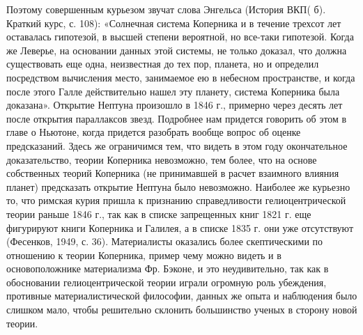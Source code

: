Поэтому совершенным курьезом звучат слова Энгельса (История ВКП( б).
Краткий курс, с. 108): «Солнечная система Коперника и в течение
трехсот лет оставалась гипотезой, в высшей степени вероятной, но
все-таки гипотезой. Когда же Леверье, на основании данных этой
системы, не только доказал, что должна существовать еще одна,
неизвестная до тех пор, планета, но и определил посредством вычисления
место, занимаемое ею в небесном пространстве, и когда после этого
Галле действительно нашел эту планету, система Коперника была
доказана». Открытие Нептуна произошло в 1846 г., примерно через десять
лет после открытия параллаксов звезд. Подробнее нам придется говорить
об этом в главе о Ньютоне, когда придется разобрать вообще вопрос об
оценке предсказаний. Здесь же ограничимся тем, что видеть в этом году
окончательное доказательство, теории Коперника невозможно, тем более,
что на основе собственных теорий Коперника (не принимавшей в расчет
взаимного влияния планет) предсказать открытие Нептуна было
невозможно. Наиболее же курьезно то, что римская курия пришла к
признанию справедливости гелиоцентрической теории раньше 1846 г., так
как в списке запрещенных книг 1821 г. еще фигурируют книги Коперника и
Галилея, а в списке 1835 г. они уже отсутствуют (Фесенков, 1949, с.
36). Материалисты оказались более скептическими по отношению к теории
Коперника, пример чему можно видеть и в основоположнике материализма
Фр. Бэконе, и это неудивительно, так как в обосновании
гелиоцентрической теории играли огромную роль убеждения, противные
материалистической философии, данных же опыта и наблюдения было
слишком мало, чтобы решительно склонить большинство ученых в сторону
новой теории.

